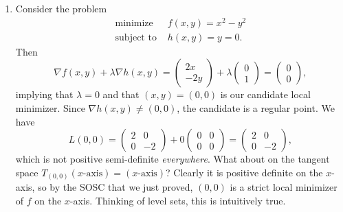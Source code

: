 \documentclass[11pt]{article}
\begin{document}
\begin{enumerate}
\item
Consider the problem
\begin{align*}
\text{minimize } &f(x,y) = x^2-y^2 \\
\text{subject to } &h(x,y) = y = 0.
\end{align*}
Then
\[
\nabla f(x,y) + \lambda \nabla h(x,y) = \begin{pmatrix}
2x \\ -2y
\end{pmatrix} + \lambda \begin{pmatrix}
0 \\ 1
\end{pmatrix} = \begin{pmatrix}
0 \\ 0
\end{pmatrix},
\]
implying that $\lambda = 0$ and that $(x,y) = (0,0)$ is our candidate local minimizer. Since $\nabla h(x,y) \neq (0,0)$, the candidate is a regular point. We have
\[
L(0,0) = \begin{pmatrix}
2 & 0 \\ 0 & -2
\end{pmatrix} + 0 \begin{pmatrix}
0 & 0 \\ 0 & 0
\end{pmatrix} = \begin{pmatrix}
2 & 0 \\ 0 & -2
\end{pmatrix},
\]
which is not positive semi-definite \emph{everywhere}. What about on the tangent space $T_{(0,0)}(\text{$x$-axis})=(\text{$x$-axis})$? Clearly it is positive definite on the $x$-axis, so by the SOSC that we just proved, $(0,0)$ is a strict local minimizer of $f$ on the $x$-axis. Thinking of level sets, this is intuitively true.


\end{enumerate}
\end{document}
